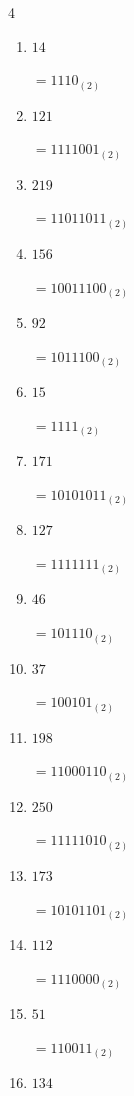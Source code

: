 \begin{multicols}{4}
\begin{enumerate}
        $=10001001_{(2)}$

  \item $14$

        $=1110_{(2)}$

  \item $121$

        $=1111001_{(2)}$

  \item $219$

        $=11011011_{(2)}$

  \item $156$

        $=10011100_{(2)}$

  \item $92$

        $=1011100_{(2)}$

  \item $15$

        $=1111_{(2)}$

  \item $171$

        $=10101011_{(2)}$

  \item $127$

        $=1111111_{(2)}$

  \item $46$

        $=101110_{(2)}$

  \item $37$

        $=100101_{(2)}$

  \item $198$

        $=11000110_{(2)}$

\columnbreak %

  \item $250$

        $=11111010_{(2)}$

  \item $173$

        $=10101101_{(2)}$

  \item $112$

        $=1110000_{(2)}$

  \item $51$

        $=110011_{(2)}$

  \item $134$


\end{enumerate}
\end{multicols}

